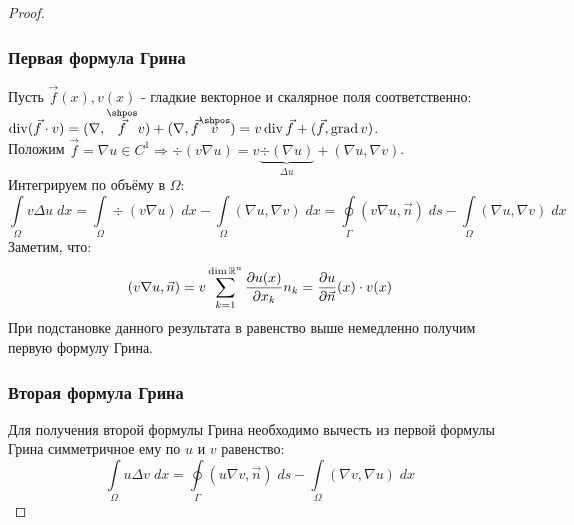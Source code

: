 \documentclass[../main.tex]{subfiles}
\begin{document}
\begin{proof}\ \\
\subsubsection{Первая формула Грина}
Пусть $\vec{f}(x), v(x)$ - гладкие векторное и скалярное поля соответственно: $\div(\vec{f} \cdot v) = (\nabla, \overset{\shpos}{\vec{f}}v) + (\nabla, \vec{f}\overset{\shpos}{v}) = v\div \vec{f} + (\vec{f}, \grad{v})$. \\
Положим $\vec{f} = \nabla u \in C^1 \Rightarrow \div (v \nabla u) = v \underbrace{\div(\nabla u)}_{\Delta u} + (\nabla u, \nabla v)$. \\
Интегрируем по объёму в $\Omega$:
\begin{equation*}
	\int\limits_{\Omega} v \Delta u\;dx = 	\int\limits_{\Omega} \div(v\nabla u)\;dx -\int\limits_{\Omega} (\nabla u, \nabla v)\;dx = \oint\limits_{\Gamma}(v \nabla u, \vec{n})\;ds - \int\limits_{\Omega}(\nabla u, \nabla v)\;dx
\end{equation*}
Заметим, что:
$$(v\nabla u, \vec{n}) = v \sum\limits_{k = 1}^{\dim \mathbb{R}^n}\dfrac{\partial u(x)}{\partial x_k} n_k = \dfrac{\partial u}{\partial \vec{n}}(x) \cdot v(x)$$
При подстановке данного результата в равенство выше немедленно получим первую формулу Грина.
\subsubsection{Вторая формула Грина}
Для получения второй формулы Грина необходимо вычесть из первой формулы Грина симметричное ему по $u$ и $v$ равенство:
$$\int\limits_{\Omega} u \Delta v\;dx = \oint\limits_{\Gamma}(u \nabla v, \vec{n})\;ds - \int\limits_{\Omega}(\nabla v, \nabla u)\;dx$$
\end{proof}
\end{document}

